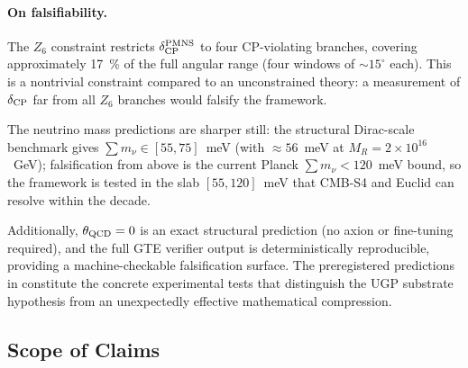 \documentclass[11pt]{article}
\theoremstyle{remark}
\begin{document}
\paragraph{On falsifiability.}
The $Z_6$ constraint restricts $\delta_{\rm CP}^{\rm PMNS}$ to four CP-violating branches, covering approximately \SI{17}{\percent} of the full angular range (four windows of $\sim 15^\circ$ each).
This is a nontrivial constraint compared to an unconstrained theory: a measurement of $\delta_{\rm CP}$ far from all $Z_6$ branches would falsify the framework.

\smallskip
The neutrino mass predictions are sharper still: the structural Dirac-scale benchmark gives $\sum m_\nu \in [55, 75]$~meV (with $\approx 56$~meV at $M_R = 2\times 10^{16}$~GeV); falsification from above is the current Planck $\sum m_\nu < 120$~meV bound, so the framework is tested in the slab $[55, 120]$~meV that CMB-S4 and Euclid can resolve within the decade.

\smallskip
Additionally, $\theta_{\rm QCD} = 0$ is an exact structural prediction (no axion or fine-tuning required), and the full GTE verifier output is deterministically reproducible, providing a machine-checkable falsification surface.
The preregistered predictions in  constitute the concrete experimental tests that distinguish the UGP substrate hypothesis from an unexpectedly effective mathematical compression.

\subsection{Scope of Claims}
\label{subsec:scope_of_claims}
\end{document}
